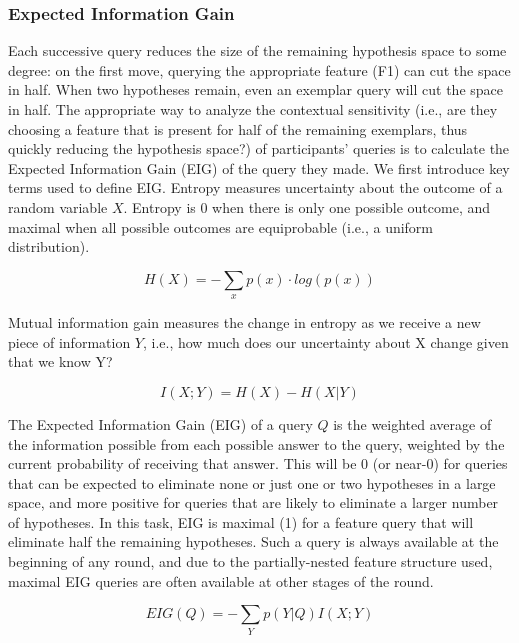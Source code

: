 \documentclass[man,floatsintext]{apa6}
\begin{document}
\subsubsection{Expected Information Gain}

Each successive query reduces the size of the remaining hypothesis space to some degree: on the first move, querying the appropriate feature (F1) can cut the space in half. When two hypotheses remain, even an exemplar query will cut the space in half. The appropriate way to analyze the contextual sensitivity (i.e., are they 
choosing a feature that is present for half of the remaining exemplars, thus quickly 
reducing the hypothesis space?) of participants' queries is to calculate the Expected 
Information Gain (EIG) of the query they made. We first introduce key terms used to 
define EIG. Entropy measures uncertainty about the outcome of a random variable 
$X$. Entropy is 0 when there is only one possible outcome, and maximal when all 
possible outcomes are equiprobable (i.e., a uniform distribution).

\begin{equation}
  H(X) = -\sum_{x} p(x) \cdot log(p(x))
\end{equation}

Mutual information gain measures the change in entropy as we receive a new piece 
of information $Y$, i.e., how much does our uncertainty about X change given that 
we know Y?

\begin{equation}
  I(X;Y) = H(X) - H(X|Y)
\end{equation}

The Expected Information Gain (EIG) of a query $Q$ is the weighted average of the 
information possible from each possible answer to the query, weighted by the 
current probability of receiving that answer. This will be 0 (or near-0) for queries that 
can be expected to eliminate none or just one or two hypotheses in a large space, 
and more positive for queries that are likely to eliminate a larger number of 
hypotheses. In this task, EIG is maximal (1) for a feature query that will eliminate 
half the remaining hypotheses. Such a query is always available at the beginning of 
any round, and due to the partially-nested feature structure used, maximal EIG 
queries are often available at other stages of the round.

\begin{equation}
  EIG(Q) = -\sum_{Y} p(Y|Q) I(X;Y)
\end{equation}
\end{document}
